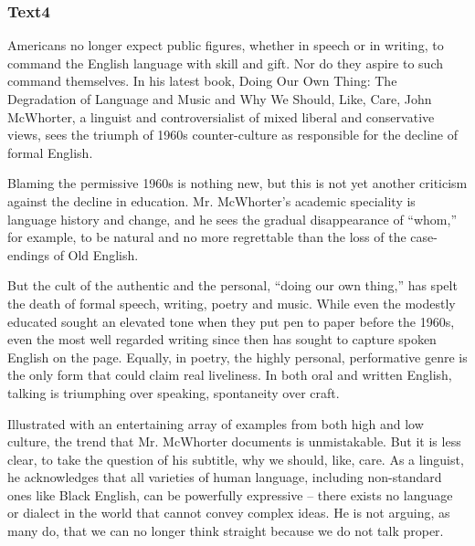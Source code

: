 \documentclass[a4paper]{article}
\begin{document}
\subsubsection{Text4}

\par
Americans no longer expect public figures, whether in speech or in writing, to command the English language with skill and gift. Nor do they aspire to such command themselves. In his latest book, Doing Our Own Thing: The Degradation of Language and Music and Why We Should, Like, Care, John McWhorter, a linguist and controversialist of mixed liberal and conservative views, sees the triumph of 1960s counter-culture as responsible for the decline of formal English.

\par
Blaming the permissive 1960s is nothing new, but this is not yet another criticism against the decline in education. Mr. McWhorter’s academic speciality is language history and change, and he sees the gradual disappearance of “whom,” for example, to be natural and no more regrettable than the loss of the case-endings of Old English.

\par
But the cult of the authentic and the personal, “doing our own thing,” has spelt the death of formal speech, writing, poetry and music. While even the modestly educated sought an elevated tone when they put pen to paper before the 1960s, even the most well regarded writing since then has sought to capture spoken English on the page. Equally, in poetry, the highly personal, performative genre is the only form that could claim real liveliness. In both oral and written English, talking is triumphing over speaking, spontaneity over craft.

\par
Illustrated with an entertaining array of examples from both high and low culture, the trend that Mr. McWhorter documents is unmistakable. But it is less clear, to take the question of his subtitle, why we should, like, care. As a linguist, he acknowledges that all varieties of human language, including non-standard ones like Black English, can be powerfully expressive -- there exists no language or dialect in the world that cannot convey complex ideas. He is not arguing, as many do, that we can no longer think straight because we do not talk proper.
\end{document}
